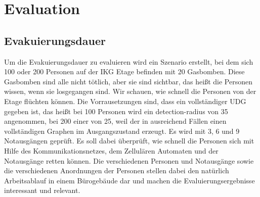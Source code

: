 \chapter{Evaluation}
\label{cha:evaluation}



\section{Evakuierungsdauer}
Um die Evakuierungsdauer zu evaluieren wird ein Szenario erstellt, bei dem sich 100 oder 200 Personen auf der IKG Etage befinden mit 20 Gasbomben. Diese Gasbomben sind alle nicht tötlich, aber sie sind sichtbar, das heißt die Personen wissen, wenn sie losgegangen sind. Wir schauen, wie schnell die Personen von der Etage flüchten können. Die Vorrausetzungen sind, dass ein vollständiger UDG gegeben ist, das heißt bei 100 Personen wird ein detection-radius von 35 angenommen, bei 200 einer von 25, weil der in ausreichend Fällen einen vollständigen Graphen im Ausgangszustand erzeugt. Es wird mit 3, 6 und 9 Notausgängen geprüft. Es soll dabei überprüft, wie schnell die Personen sich mit Hilfe des Kommunikationsnetzes, dem Zellulären Automaten und der Notausgänge retten können. Die verschiedenen Personen und Notausgänge sowie die verschiedenen Anordnungen der Personen stellen dabei den natürlich Arbeitsablauf in einem Bürogebäude dar und machen die Evaluierungsergebnisse interessant und relevant.

